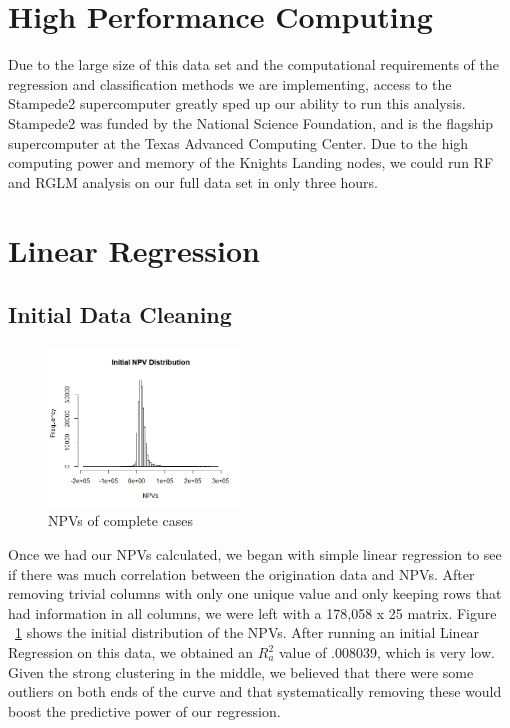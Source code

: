 \documentclass[12 pt]{uncw_thesis}
\theoremstyle{plain}
\theoremstyle{remark}
\theoremstyle{definition}
\begin{document}
\section{High Performance Computing}
Due to the large size of this data set and the computational requirements of the regression and classification methods we are implementing, access to the Stampede2 supercomputer greatly sped up our ability to run this analysis. Stampede2 was funded by the National Science Foundation, and is the flagship supercomputer at the Texas Advanced Computing Center. Due to the high computing power and memory of the Knights Landing nodes, we could run RF and RGLM analysis on our full data set in only three hours.  
\section{Linear Regression}
\subsection{Initial Data Cleaning}
\begin{figure}
	\vspace{-2cm}
	\centering
	\includegraphics[width=0.45\textwidth]{images/InitalNPVs.jpeg}
	\caption{NPVs of complete cases}
	\label{fig:InitialNPVs}
\end{figure}
Once we had our NPVs calculated, we began with simple linear regression to see if there was much correlation between the origination data and NPVs. After removing trivial columns with only  one unique value and only keeping rows that had information in all columns, we were left with a 178,058 x 25 matrix. Figure ~\ref{fig:InitialNPVs} shows the initial distribution of the NPVs.  After running an initial Linear Regression on this data, we obtained an \(R_a^2\) value of .008039, which is very low. Given the strong clustering in the middle, we believed that there were some outliers on both ends of the curve and that systematically removing these would boost the predictive power of our regression. 
\end{document}
